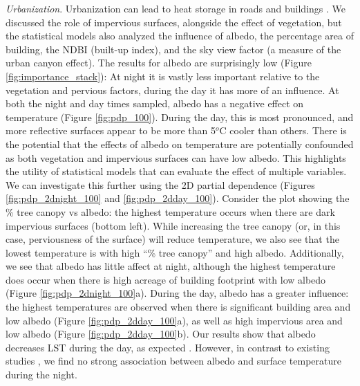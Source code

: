 \documentclass[final,3p,times,onecolumn,sort&compress]{elsarticle}
\begin{document}
\textit{Urbanization}.
Urbanization can lead to heat storage in roads and buildings \citep{Zhou2014-wc, Voogt2003-mm}. 
We discussed the role of impervious surfaces, alongside the effect of vegetation, but the statistical models also analyzed the influence of albedo, the percentage area of building, the NDBI (built-up index), and the sky view factor (a measure of the urban canyon effect).
The results for albedo are surprisingly low (Figure \ref{fig:importance_stack}): 
At night it is vastly less important relative to the vegetation and pervious factors, during the day it has more of an influence.
At both the night and day times sampled, albedo has a negative effect on temperature (Figure \ref{fig:pdp_100}).
During the day, this is most pronounced, and more reflective surfaces appear to be more than 5$^o$C cooler than others.
There is the potential that the effects of albedo on temperature are potentially confounded as both vegetation and impervious surfaces can have low albedo.
This highlights the utility of statistical models that can evaluate the effect of multiple variables.
We can investigate this further using the 2D partial dependence (Figures \ref{fig:pdp_2dnight_100} and \ref{fig:pdp_2dday_100}). 
Consider the plot showing the \% tree canopy vs albedo: the highest temperature occurs when there are dark impervious surfaces (bottom left).
While increasing the tree canopy (or, in this case, perviousness of the surface) will reduce temperature, we also see that the lowest temperature is with high ``\% tree canopy'' and high albedo.
Additionally, we see that albedo has little affect at night, although the highest temperature does occur when there is high acreage of building footprint with low albedo (Figure \ref{fig:pdp_2dnight_100}a).
During the day, albedo has a greater influence: the highest temperatures are observed when there is significant building area and low albedo (Figure \ref{fig:pdp_2dday_100}a), as well as high impervious area and low albedo (Figure \ref{fig:pdp_2dday_100}b).
Our results show that albedo decreases LST during the day, as expected \cite{Oke2017-or}.
However, in contrast to existing studies \citep{Peng2012-iy, Zhou2014-wc}, we find no strong association between albedo and surface temperature during the night.
\end{document}
